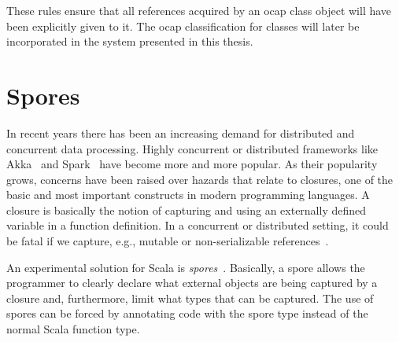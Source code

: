 These rules ensure that all references acquired by an ocap class object will have been
explicitly given to it. The ocap classification for classes will later be
incorporated in the system presented in this thesis.


\section{Spores}\label{sec:spores}

In recent years there has been an increasing demand for distributed and
concurrent data processing. Highly concurrent or distributed frameworks like
Akka~\parencite{akka} and Spark~\parencite{spark} have become more and more
popular. As their popularity grows, concerns have been raised over hazards that
relate to closures, one of the basic and most important constructs in modern
programming languages. A closure is basically the notion of capturing and using
an externally defined variable in a function definition. In a concurrent or distributed
setting, it could be fatal if we capture, e.g., mutable or non-serializable
references~\parencite{conf/ecoop/MillerHO14}. 

An experimental solution for Scala is
\emph{spores}~\parencite{conf/ecoop/MillerHO14}. Basically, a spore allows the
programmer to clearly declare what external objects are being captured by a
closure and, furthermore, limit what types that can be captured. The use of spores
can be forced by annotating code with the spore type instead of the normal
Scala function type. 




